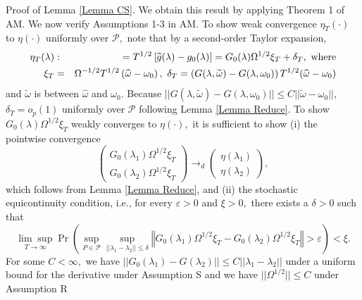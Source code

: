 \documentclass[11pt]{article}
\begin{document}
\bigskip

\noindent Proof of Lemma \ref{Lemma CS}. We obtain this result by applying
Theorem 1 of AM. We now verify Assumptions 1-3 in AM. To show weak
convergence $\eta _{T}(\cdot )$ to $\eta (\cdot )$ uniformly over $\mathcal{P%
},$ note that by a second-order Taylor expansion,%
\begin{eqnarray}
\eta _{T}(\lambda ) &:&=T^{1/2}\left[ \widehat{g}(\lambda )-g_{0}(\lambda )%
\right] =G_{0}(\lambda )\Omega ^{1/2}\xi _{T}+\delta _{T},\text{ where} 
\notag \\
\xi _{T} &=&\Omega ^{-1/2}T^{1/2}\left( \widehat{\omega }-\omega _{0}\right)
,\text{ }\delta _{T}=\left( G(\lambda ,\widetilde{\omega })-G(\lambda
,\omega _{0})\right) T^{1/2}(\widehat{\omega }-\omega _{0})
\end{eqnarray}%
and $\widetilde{\omega }$ is between $\widehat{\omega }$ and $\omega _{0}.$
Because $||G(\lambda ,\widetilde{\omega })-G(\lambda ,\omega _{0})||\leq C||%
\widetilde{\omega }-\omega _{0}||$, $\delta _{T}=o_{p}(1)$ uniformly over $%
\mathcal{P}$ following Lemma \ref{Lemma Reduce}. To show $G_{0}(\lambda
)\Omega ^{1/2}\xi _{T}$ weakly converges to $\eta (\cdot ),$ it is
sufficient to show (i) the pointwise convergence%
\begin{equation}
\left( 
\begin{array}{c}
G_{0}(\lambda _{1})\Omega ^{1/2}\xi _{T} \\ 
G_{0}(\lambda _{2})\Omega ^{1/2}\xi _{T}%
\end{array}%
\right) \rightarrow _{d}\left( 
\begin{array}{c}
\eta (\lambda _{1}) \\ 
\eta (\lambda _{2})%
\end{array}%
\right) ,
\end{equation}%
which follows from Lemma \ref{Lemma Reduce}, and (ii) the stochastic
equicontinuity condition, i.e., for every $\varepsilon >0$ and $\xi >0,$
there exists a $\delta >0$ such that%
\begin{equation}
\underset{T\rightarrow \infty }{\lim \sup }\Pr \left( \underset{P\in 
\mathcal{P}}{\sup }\underset{||\lambda _{1}-\lambda _{2}||\leq \delta }{\sup 
}\left \Vert G_{0}(\lambda _{1})\Omega ^{1/2}\xi _{T}-G_{0}(\lambda
_{2})\Omega ^{1/2}\xi _{T}\right \Vert >\varepsilon \right) <\xi .
\end{equation}%
For some $C<\infty ,$ we have $||G_{0}(\lambda _{1})-G(\lambda _{2})||\leq
C||\lambda _{1}-\lambda _{2}||$ under a uniform bound for the derivative
under Assumption S and we have $||\Omega ^{1/2}||\leq C$ under Assumption R
\end{document}
